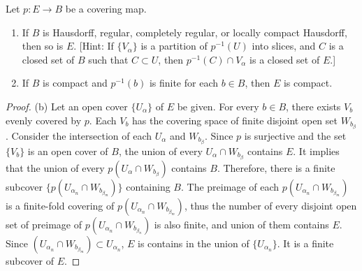 \documentclass{article}
\begin{document}
\begin{multicols}{2}
\begin{exercise}
Let $p:E\to B$ be a covering map.
\begin{enumerate}[label={(\alph*)}]
\item If $B$ is Hausdorff, regular, completely regular, or locally compact Hausdorff, then so is $E$. [Hint: If $\{V_\alpha\}$ is a partition of $p^{-1}(U)$ into slices, and $C$ is a closed set of $B$ such that $C\subset U$, then $p^{-1}(C)\cap V_\alpha$ is a closed set of $E$.]
\item If $B$ is compact and $p^{-1}(b)$ is finite for each $b\in B$, then $E$ is compact.
\end{enumerate}
\end{exercise}
\begin{proof}
(b) Let an open cover $\{U_\alpha\}$ of $E$ be given. For every $b\in B$, there exists $V_b$ evenly covered by $p$. Each $V_b$ has the covering space of finite disjoint open set $W_{b_\beta}$. Consider the intersection of each $U_\alpha$ and $W_{b_\beta}$. Since $p$ is surjective and the set $\{V_b\}$ is an open cover of $B$, the union of every $U_\alpha \cap W_{b_\beta}$ contains $E$. It implies that the union of every $p(U_\alpha \cap W_{b_\beta})$ contains $B$. Therefore, there is a finite subcover $\{p(U_{\alpha_n}\cap W_{b_{\beta_m}})\}$ containing $B$. The preimage of each $p(U_{\alpha_n}\cap W_{b_{\beta_m}})$ is a finite-fold covering of $p(U_{\alpha_n}\cap W_{b_{\beta_m}})$, thus the number of every disjoint open set of preimage of $p(U_{\alpha_n}\cap W_{b_{\beta_n}})$ is also finite, and union of them contains $E$. Since $(U_{\alpha_n}\cap W_{b_{\beta_m}}) \subset U_{\alpha_n}$, $E$ is contains in the union of $\{U_{\alpha_n}\}$. It is a finite subcover of $E$. 
\end{proof}

\columnbreak


\end{multicols}
\end{document}
